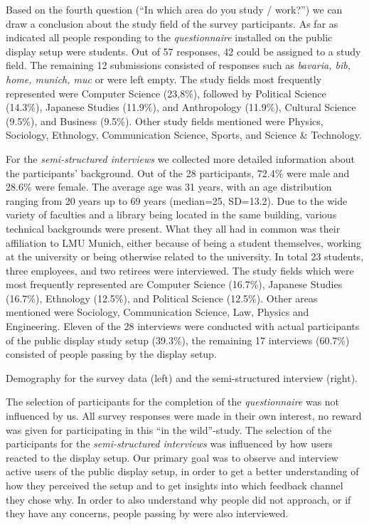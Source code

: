 		Based on the fourth question (``In which area do you study / work?'') we can draw a conclusion about the study field of the survey participants. As far as indicated all people responding to the \textit{questionnaire} installed on the public display setup were students. Out of 57 responses, 42 could be assigned to a study field. The remaining 12 submissions consisted of responses such as \textit{bavaria, bib, home, munich, muc} or were left empty. The study fields most frequently represented were Computer Science (23,8\%), followed by Political Science (14.3\%), Japanese Studies (11.9\%), and Anthropology (11.9\%), Cultural Science (9.5\%), and Business (9.5\%). Other study fields mentioned were Physics, Sociology, Ethnology, Communication Science, Sports, and Science \& Technology. 

		For the \textit{semi-structured interviews} we collected more detailed information about the participants' background. Out of the 28 participants, 72.4\% were male and 28.6\% were female. The average age was 31 years, with an age distribution ranging from 20 years up to 69 years (median=25, SD=13.2). Due to the wide variety of faculties and a library being located in the same building, various technical backgrounds were present. What they all had in common was their affiliation to LMU Munich, either because of being a student themselves, working at the university or being otherwise related to the university. In total 23 students, three employees, and two retirees were interviewed. The study fields which were most frequently represented are Computer Science (16.7\%), Japanese Studies (16.7\%), Ethnology (12.5\%), and Political Science (12.5\%). Other areas mentioned were Sociology, Communication Science, Law, Physics and Engineering. 
		Eleven of the 28 interviews were conducted with actual participants of the public display study setup (39.3\%), the remaining 17 interviews (60.7\%) consisted of people passing by the display setup.


		\begin{table}[bh]
			\small
			\center
			

			\caption[Demographics of Field Study]{Demography for the survey data (left) and the semi-structured interview (right).}
			\label{table:demographics}
		\end{table}


		The selection of participants for the completion of the \textit{questionnaire} was not influenced by us. All survey responses were made in their own interest, no reward was given for participating in this ``in the wild''-study.
		The selection of the participants for the \textit{semi-structured interviews} was influenced by how users reacted to the display setup. Our primary goal was to observe and interview active users of the public display setup, in order to get a better understanding of how they perceived the setup and to get insights into which feedback channel they chose why. In order to also understand why people did not approach, or if they have any concerns, people passing by were also interviewed. 
		

